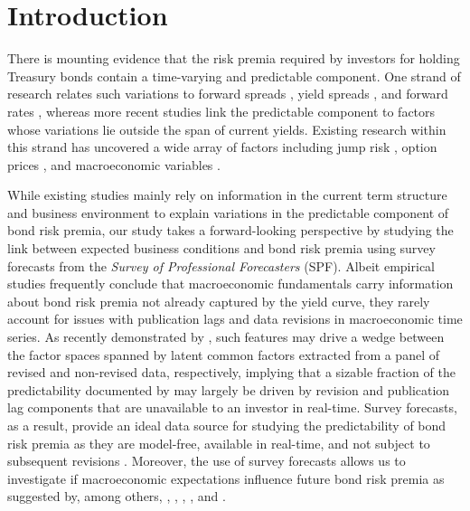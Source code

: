 \documentclass[12pt,letterpaper,leqno,doublespacing]{article}
\begin{document}
\section{Introduction}\label{Sec:e_introduction}
There is mounting evidence that the risk premia required by investors for holding Treasury bonds contain a time-varying and predictable component. One strand of research relates such variations to forward spreads \citep{FamaBliss1987,Fama2006}, yield spreads \citep{KeimStambaugh1986,CampbellShiller1991}, and forward rates \citep{CochranePiazzesi2005,DahlquistHasseltoft2013,Zhu2015}, whereas more recent studies link the predictable component to factors whose variations lie outside the span of current yields. Existing research within this strand has uncovered a wide array of factors including jump risk \citep{WrightZhou2009}, option prices \citep{AlmeidaGravelineJoslin2011}, and macroeconomic variables \citep{Ilmanen1995,Moench2008,CooperPriestley2009,LudvigsonNg2009,Wright2011,FaveroNiuSala2012,JoslinPriebschSingleton2014,ZhouZhu2015}. 

While existing studies mainly rely on information in the current term structure and business environment to explain variations in the predictable component of bond risk premia, our study takes a forward-looking perspective by studying the link between expected business conditions and bond risk premia using survey forecasts from the \emph{Survey of Professional Forecasters} (SPF). Albeit empirical studies frequently conclude that macroeconomic fundamentals carry information about bond risk premia not already captured by the yield curve, they rarely account for issues with publication lags and data revisions in macroeconomic time series. As recently demonstrated by \cite{GhyselsHoranMoench2014}, such features may drive a wedge between the factor spaces spanned by latent common factors extracted from a panel of revised and non-revised data, respectively, implying that a sizable fraction of the predictability documented by \cite{LudvigsonNg2009} may largely be driven by revision and publication lag components that are unavailable to an investor in real-time. Survey forecasts, as a result, provide an ideal data source for studying the predictability of bond risk premia as they are model-free, available in real-time, and not subject to subsequent revisions \citep{AmatoSwanson2001,CroushoreStark2001,PesaranTimmermann2005}. Moreover, the use of survey forecasts allows us to investigate if macroeconomic expectations influence future bond risk premia as suggested by, among others, \cite{ChenRollRoss1986}, \cite{FamaFrench1989}, \cite{Barro1990}, \cite{Fama1990}, and \cite{FersonHarvey1991}. 
\end{document}
